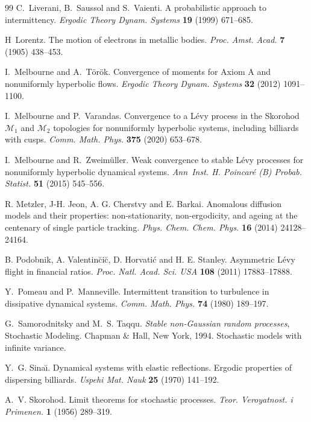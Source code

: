 \documentclass[12pt]{article}
\numberwithin{equation}{section}
\begin{document}
\begin{thebibliography}{99}
C.~Liverani, B.~Saussol and S.~Vaienti. {A probabilistic approach to
  intermittency}. \emph{Ergodic Theory Dynam. Systems} \textbf{19} (1999)
  671--685.

H~Lorentz. The motion of electrons in metallic bodies. \emph{Proc. Amst. Acad.}
  \textbf{7} (1905) 438--453.

I.~Melbourne and A.~T{\" o}r{\" o}k. {Convergence of moments for Axiom A and
  nonuniformly hyperbolic flows}. \emph{Ergodic Theory Dynam. Systems}
  \textbf{32} (2012) 1091--1100.

I.~Melbourne and P.~Varandas. Convergence to a L\'evy process in the Skorohod
  ${\mathcal M}_1$ and ${\mathcal M}_2$ topologies for nonuniformly hyperbolic
  systems, including billiards with cusps. \emph{Comm. Math. Phys.}
  \textbf{375} (2020) 653--678.

I.~Melbourne and R.~Zweim{\"u}ller. {Weak convergence to stable L\'evy
  processes for nonuniformly hyperbolic dynamical systems}. \emph{Ann\ Inst. H.
  Poincar{\'e} (B) Probab. Statist.} \textbf{51} (2015) 545--556.

R. Metzler, J-H. Jeon, A. G. Cherstvy and E. Barkai.
 Anomalous diffusion models and their properties: non-stationarity, non-ergodicity, and ageing at the centenary of single particle tracking.
\emph{Phys. Chem. Chem. Phys.} \textbf{16} (2014) 24128--24164.

 B. Podobnik, A. Valentin\u{c}i\u{c}, D. Horvati\'c and
H. E. Stanley.
Asymmetric L\'evy flight in financial ratios.
\emph{Proc. Natl. Acad. Sci. USA} \textbf{108} (2011) 17883--17888.

Y.~Pomeau and P.~Manneville. Intermittent transition to turbulence in
  dissipative dynamical systems. \emph{Comm. Math. Phys.} \textbf{74} (1980)
  189--197.

G.~Samorodnitsky and M.~S. Taqqu. \emph{Stable non-{G}aussian random
  processes}, Stochastic Modeling. Chapman \& Hall, New York, 1994. Stochastic
  models with infinite variance.

Y.~G. Sina{\u\i}. Dynamical systems with elastic reflections. {E}rgodic
  properties of dispersing billiards. \emph{Uspehi Mat. Nauk} \textbf{25}
  (1970) 141--192.

A.~V. Skorohod. Limit theorems for stochastic processes. \emph{Teor.
  Veroyatnost. i Primenen.} \textbf{1} (1956) 289--319.


\end{thebibliography}
\end{document}

